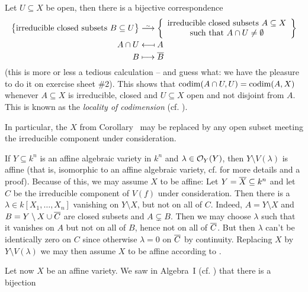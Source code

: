 \documentclass[a4paper,parskip=half,numbers=enddot, DIV=12, headheight=30pt]{scrreprt}
\begin{document}
\begin{rem}
    \begin{alphanumerate}
	   \item{} Let $U\subseteq X$ be open, then there is a bijective correspondence 
        \begin{align*}
	        \big\{\text{irreducible closed subsets }B\subseteq U\big\}&\isomorphism\left\{
	        \begin{array}{c}
		        \text{irreducible closed subsets }A\subseteq X\\
		        \text{such that }A\cap U\not=\emptyset
	        \end{array}
	        \right\}\\
            A\cap U &\longmapsfrom A\\
            B&\longmapsto \overline{B}
        \end{align*}
        (this is more or less a tedious calculation -- and guess what: we have the pleasure to do it on exercise sheet \#2). This shows that $\operatorname{codim} (A\cap U, U)  = \operatorname{codim}(A,X)$ whenever $A\subseteq X$ is irreducible, closed and $U\subseteq X$ open and not disjoint from $A$. This is known as the \emph{locality of codimension} (cf. \cite[Remark~2.1.3]{alg1}).
        \item In particular, the $X$ from Corollary~ may be replaced by any open subset meeting the irreducible component under consideration.
        \item If $Y\subseteq k^n$ is an affine algebraic variety in $k^n$ and $\lambda\in\mathcal{O}_Y(Y)$, then $Y\setminus V(\lambda)$ is affine (that is, isomorphic to an affine algebraic variety, cf. \cite[Proposition~2.2.4]{alg1} for more details and a proof). Because of this, we may assume $X$ to be affine: Let $Y=\overline X\subseteq k^n$ and let $C$ be the irreducible component of $V(f)$ under consideration. Then there is a $\lambda\in k[X_1,\ldots,X_n]$ vanishing on $Y\setminus X$, but not on all of $C$. Indeed, $A=Y\setminus X$ and $B= Y\setminus X\cup\overline C$ are closed subsets and $A\subsetneq B$. Then we may choose $\lambda$ such that it vanishes on $A$ but not on all of $B$, hence not on all of $\overline C$. But then $\lambda$ can't be identically zero on $C$ since otherwise $\lambda=0$ on $\overline C$ by continuity. Replacing $X$ by $Y\setminus V(\lambda)$ we may then assume $X$ to be affine according to .
        \item Let now $X$ be an affine variety. We saw in Algebra~I (cf. \cite[Corollary~2.2.2]{alg1}) that there is a bijection

\end{alphanumerate}
\end{rem}
\end{document}
